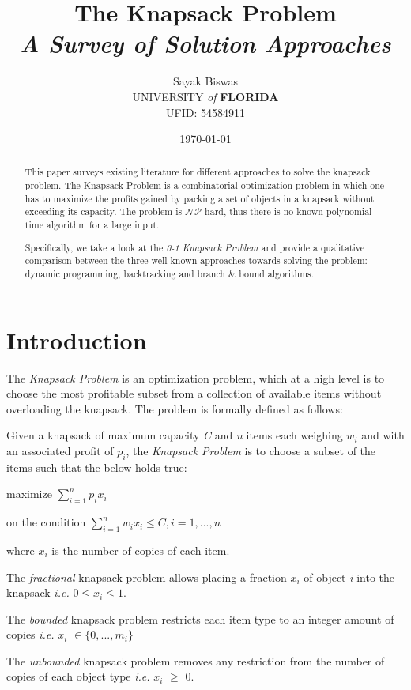 \documentclass{article}
\title{The Knapsack Problem \\ \small \textit{A Survey of Solution Approaches}}
\date{\small \today}
\author{Sayak Biswas \\ \small UNIVERSITY \textit{of} \textbf{FLORIDA} \\ \small UFID: 54584911}
\begin{document}
\maketitle
\begin{abstract}
This paper surveys existing literature for different approaches to solve the knapsack problem. The Knapsack Problem is a combinatorial optimization problem in which one has to maximize the profits gained by packing a set of objects in a knapsack without exceeding its capacity. The problem is $\mathcal{NP}$-hard, thus there is no known polynomial time algorithm for a large input.

Specifically, we take a look at the \textit{0-1 Knapsack Problem} and provide a qualitative comparison between the three well-known approaches towards solving the problem: dynamic programming, backtracking and branch \& bound algorithms.
\end{abstract}
\newpage


\section{Introduction}
The \textit{Knapsack Problem} is an optimization problem, which at a high level is to choose the most profitable subset from a collection of available items without overloading the knapsack. The problem is formally defined as follows:

Given a knapsack of maximum capacity \textit{C} and \textit{n} items each weighing \textit{$w_{i}$} and with an associated profit of \textit{$p_{i}$}, the \textit{Knapsack Problem} is to choose a subset of the items such that the below holds true:

maximize $\sum\limits_{i=1}^{n}\textit{$p_{i}x_{i}$}$

on the condition $\sum\limits_{i=1}^{n}\textit{$w_{i}x_{i}$} \leq \textit{C}, \textit{i} = 1,...,\textit{n}$

where \textit{$x_{i}$} is the number of copies of each item.

The \textit{fractional} knapsack problem allows placing a fraction \textit{$x_{i}$} of object \textit{i} into the knapsack \textit{i.e.} $0 \le \textit{$x_{i}$} \le 1$.

The \textit{bounded} knapsack problem restricts each item type to an integer amount of copies \textit{i.e.} \textit{$x_{i}$} $\in \{0,...,m_{i}\}$

The \textit{unbounded} knapsack problem removes any restriction from the number of copies of each object type \textit{i.e.} \textit{$x_{i}$} $\ge$ 0.
\end{document}
